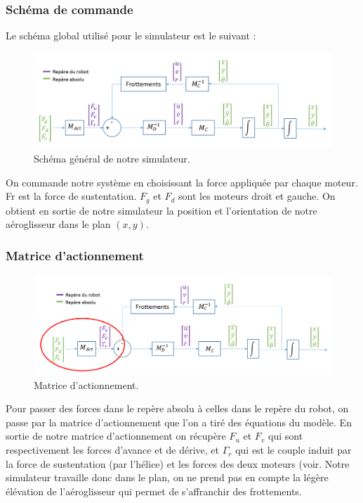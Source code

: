 \documentclass[a4paper,10pt]{article}
\begin{document}
\subsubsection{Schéma de commande}
Le schéma global utilisé pour le simulateur est le suivant :

\begin{figure}[H]
\bigcenter\includegraphics[scale=0.5]{images/commande.png}
\caption{Schéma général de notre simulateur.}
\end{figure}

On commande notre système en choisissant la force appliquée par chaque moteur. Fr est la force de sustentation. $F_g$ et $F_d$ sont les moteurs droit et gauche. On obtient en sortie de notre simulateur la position et l’orientation de notre aéroglisseur dans le plan $(x,y)$. 

\subsubsection{Matrice d'actionnement}
\begin{figure}[H]
\bigcenter\includegraphics[scale=0.5]{images/matrice_actionnement.png}
\caption{Matrice d'actionnement.}
\end{figure}

Pour passer des forces dans le repère absolu à celles dans le repère du robot, on passe par la matrice d’actionnement que l’on a tiré des équations du modèle. En sortie de notre matrice d’actionnement on récupère $F_u$ et $F_v$ qui sont respectivement les forces d’avance et de dérive, et $\Gamma_r$ qui est le couple induit par la force de sustentation (par l’hélice) et les forces des deux moteurs (voir. Notre simulateur travaille donc dans le plan, on ne prend pas en compte la légère élévation de l’aéroglisseur qui permet de s’affranchir des frottements. 
\end{document}
